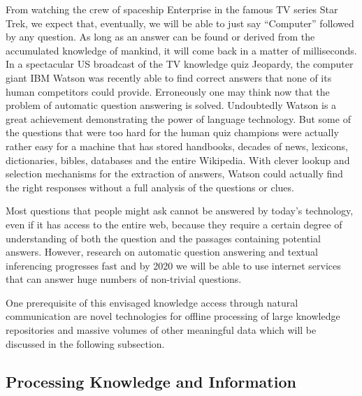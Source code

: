 \documentclass[10pt, plain]{../../metanetpaper}
\begin{document}
\begin{multicols}{2}
From watching the crew of spaceship Enterprise in the famous TV series Star Trek, we expect that, eventually, we will be able to just say “Computer” followed by any question. As long as an answer can be found or derived from the accumulated knowledge of mankind, it will come back in a matter of milliseconds. In a spectacular US broadcast of the TV knowledge quiz Jeopardy, the computer giant IBM Watson was recently able to find correct answers that none of its human competitors could provide. Erroneously one may think now that the problem of automatic question answering is solved. Undoubtedly Watson is a great achievement demonstrating the power of language technology. But some of the questions that were too hard for the human quiz champions were actually rather easy for a machine that has stored handbooks, decades of news, lexicons, dictionaries, bibles, databases and the entire Wikipedia. With clever lookup and selection mechanisms for the extraction of answers, Watson could actually find the right responses without a full analysis of the questions or clues.
 
Most questions that people might ask cannot be answered by today’s technology, even if it has access to the entire web, because they require a certain degree of understanding of both the question and the passages containing potential answers. However, research on automatic question answering and textual inferencing progresses fast and by 2020 we will be able to use internet services that can answer huge numbers of non-trivial questions.
 
One prerequisite of this envisaged knowledge access through natural communication are novel technologies for offline processing of large knowledge repositories and massive volumes of other meaningful data which will be discussed in the following subsection.  

\subsection{Processing Knowledge and Information}
\label{sec:proc-knowl-inform}


\end{multicols}
\end{document}
